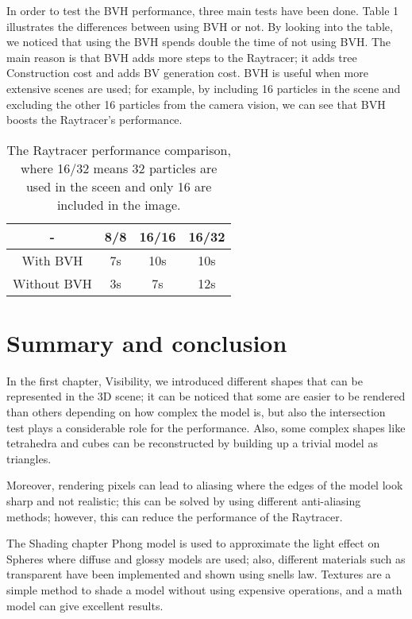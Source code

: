 \documentclass{article}
\begin{document}
	In order to test the BVH performance, three main tests have been done. Table 1 illustrates the differences between using BVH or not. By looking into the table, we noticed that using the BVH spends double the time of not using BVH. The main reason is that BVH adds more steps to the Raytracer; it adds tree Construction cost and adds BV generation cost. BVH is useful when more extensive scenes are used; for example, by including 16 particles in the scene and excluding the other 16 particles from the camera vision, we can see that BVH boosts the Raytracer's performance.
	
	\begin{table}[h!]
		\centering
		\begin{tabular}{||c c c c||} 
			\hline
			- & 8/8  & 16/16 & 16/32 \\ [0.5ex] 
			\hline\hline
			With BVH & 7s & 10s & 10s \\ 
			\hline
			Without BVH & 3s & 7s & 12s \\
			\hline
			
		\end{tabular}
		\caption{The Raytracer performance comparison, where 16/32 means 32 particles are used in the sceen and only 16 are included in the image.}
		\label{table:1}
	\end{table}
	
	
	\clearpage
	
	\section{Summary and conclusion}
	In the first chapter, Visibility, we introduced different shapes that can be represented in the 3D scene; it can be noticed that some are easier to be rendered than others depending on how complex the model is, but also the intersection test plays a considerable role for the performance. Also, some complex shapes like tetrahedra and cubes can be reconstructed by building up a trivial model as triangles.  
	
	Moreover, rendering pixels can lead to aliasing where the edges of the model look sharp and not realistic; this can be solved by using different anti-aliasing methods; however, this can reduce the performance of the Raytracer.
	
	The Shading chapter Phong model is used to approximate the light effect on Spheres where diffuse and glossy models are used; also, different materials such as transparent have been implemented and shown using snells law. Textures are a simple method to shade a model without using expensive operations, and a math model can give excellent results. 
	
\end{document}
